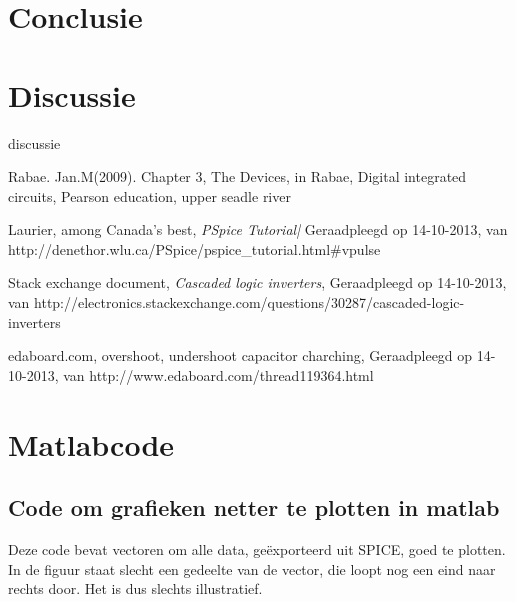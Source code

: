 \documentclass{report}
\begin{document}
\chapter{Conclusie}


\chapter {Discussie}
{discussie}

\begin{thebibliography}{La}
%
Rabae. Jan.M(2009). Chapter 3, The Devices, in Rabae, Digital integrated circuits, Pearson education, upper seadle river

Laurier, among Canada's best, \textit{PSpice Tutorial|} Geraadpleegd op 14-10-2013, van http://denethor.wlu.ca/PSpice/pspice\_tutorial.html\#vpulse

Stack exchange document, \textit{Cascaded logic inverters}, Geraadpleegd op 14-10-2013, van http://electronics.stackexchange.com/questions/30287/cascaded-logic-inverters

edaboard.com, overshoot, undershoot capacitor charching, Geraadpleegd op 14-10-2013, van http://www.edaboard.com/thread119364.html

 
\end{thebibliography}

\appendix
\chapter{Matlabcode}
\label{Aa}
\section{Code om grafieken netter te plotten in matlab}
\label{A1}
\tiny
{}
\normalsize
Deze code bevat vectoren om alle data, geëxporteerd uit SPICE, goed te plotten. In de figuur staat slecht een gedeelte van de vector, die loopt nog een eind naar rechts door. Het is dus slechts illustratief. 
\end{document}
